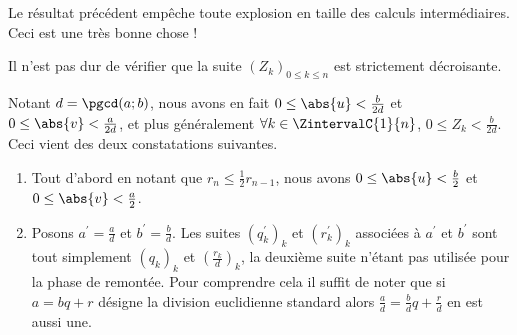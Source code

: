 \begin{remark}
	Le résultat précédent empêche toute explosion en taille des calculs intermédiaires. Ceci est une très bonne chose !
\end{remark}

\begin{remark}
	Il n'est pas dur de vérifier que la suite $(Z_k)_{0 \leq k \leq n}$ est strictement décroisante.
\end{remark}


\begin{remark}
	Notant $d = \pgcd(a ; b)$, nous avons en fait $0 \leq \abs{u} < \frac{b}{2d}$ et $0 \leq \abs{v} < \frac{a}{2d}$, et plus généralement  $\forall k \in \ZintervalC{1}{n}$, $0 \leq Z_k < \frac{b}{2d}$.
	Ceci vient des deux constatations suivantes.
	
	\begin{enumerate}
		\item Tout d'abord en notant que $r_n \leq \frac{1}{2} r_{n-1}$, nous avons $0 \leq \abs{u} < \frac{b}{2}$ et $0 \leq \abs{v} < \frac{a}{2}$.


		\item Posons $a^\prime = \frac{a}{d}$ et $b^\prime = \frac{b}{d}$.
		Les suites $(q^\prime_k)_k$ et $(r^\prime_k)_k$ associées à $a^\prime$ et $b^\prime$ sont tout simplement $(q_k)_k$ et $\left( \frac{r_k}{d} \right)_k$, la deuxième suite n'étant pas utilisée pour la phase de remontée. Pour comprendre cela il suffit de noter que si $a = bq + r$ désigne la division euclidienne standard alors $\frac{a}{d} = \frac{b}{d}q + \frac{r}{d}$ en est aussi une.
	\end{enumerate}
\end{remark}

